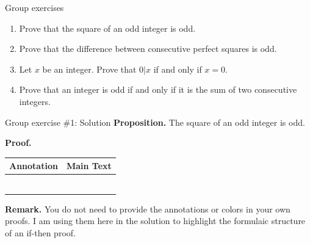 \documentclass[10pt]{beamer}
\begin{document}
\begin{frame}{Group exercises}
\begin{enumerate}
	\item Prove that the square of an odd integer is odd.
	\item Prove that the difference between consecutive perfect squares is odd.
	\item Let $x$ be an integer.  Prove that $0|x$ if and only if $x=0$.
	\item Prove that an integer is odd if and only if it is the sum of two consecutive integers.
\end{enumerate}
	
\end{frame}


\begin{frame}{Group exercise \#1: Solution}
\textbf{Proposition.} The square of an odd integer is odd.

\textbf{Proof.}

\begin{tabularx}{\textwidth}{|L{3cm}|X|}
\hline \textbf{Annotation} & \textbf{Main Text} \\ \hline
  &   \\ \hline
{} &  \\ \hline
{} &  \\ \hline
{} &    \\ \hline
  &  \\ \hline
   &  \\ \hline
\hline
\end{tabularx}
\vfill 
\footnotesize 
\textbf{Remark.}  You do not need to provide the annotations or colors in your own proofs. I am using them here in the solution to highlight the formulaic structure of an if-then proof.
\end{frame}
\end{document}
